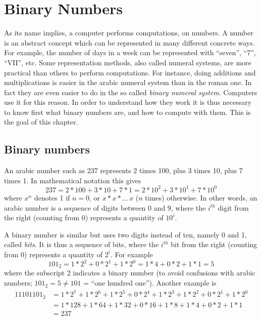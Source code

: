 
\chapter{Binary Numbers}\label{chapter:binary-numbers}

As its name implies, a computer performs computations, on numbers. A number is
an abstract concept which can be represented in many different concrete ways.
For example, the number of days in a week can be represented with ``seven'',
``7'', ``VII'', etc. Some representation methods, also called numeral systems,
are more practical than others to perform computations. For instance, doing
additions and multiplications is easier in the arabic numeral system than in
the roman one. In fact they are even easier to do in the so called {\em binary
numeral system}. Computers use it for this reason. In order to understand how
they work it is thus necessary to know first what binary numbers are, and how
to compute with them. This is the goal of this chapter.

\section{Binary numbers}

An arabic number such as 237 represents 2 times 100, plus 3 times 10, plus 7
times 1. In mathematical notation this gives
$$237 = 2*100+3*10+7*1 = 2*10^2+3*10^1+7*10^0$$
where $x^n$ denotes 1 if $n=0$, or $x * x * \ldots\,x$ ($n$ times) otherwise.
In other words, an arabic number is a sequence of digits between 0 and 9, where
the $i^{th}$ digit from the right (counting from 0) represents a quantity of
$10^i$.

A binary number is similar but uses two digits instead of ten, namely 0 and 1,
called {\em bits}. It is thus a sequence of bits, where the $i^{th}$ bit from
the right (counting from 0) represents a quantity of $2^i$. For example
$$101_2 = 1*2^2+0*2^1+1*2^0 = 1*4+0*2+1*1 = 5$$
where the subscript 2 indicates a binary number (to avoid confusions with
arabic numbers; $101_2 = 5 \ne 101$ = ``one hundred one''). Another example is
\begin{align*}
11101101_2 &= 1*2^7+1*2^6+1*2^5+0*2^4+1*2^3+1*2^2+0*2^1+1*2^0\\
  &=1*128+1*64+1*32+0*16+1*8+1*4+0*2+1*1\\
  &=237
\end{align*}

